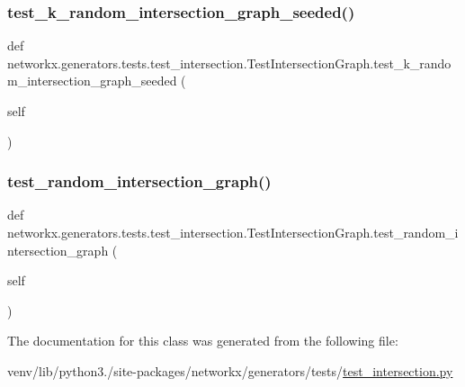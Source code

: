 \subsubsection{\texorpdfstring{test\+\_\+k\+\_\+random\+\_\+intersection\+\_\+graph\+\_\+seeded()}{test\_k\_random\_intersection\_graph\_seeded()}}
{\footnotesize\ttfamily def networkx.\+generators.\+tests.\+test\+\_\+intersection.\+Test\+Intersection\+Graph.\+test\+\_\+k\+\_\+random\+\_\+intersection\+\_\+graph\+\_\+seeded (\begin{DoxyParamCaption}\item[{}]{self }\end{DoxyParamCaption})}

\mbox{\label{classnetworkx_1_1generators_1_1tests_1_1test__intersection_1_1TestIntersectionGraph_aafbbefa0eaa78c5a6d2fe923a6c69c68}} 
\subsubsection{\texorpdfstring{test\+\_\+random\+\_\+intersection\+\_\+graph()}{test\_random\_intersection\_graph()}}
{\footnotesize\ttfamily def networkx.\+generators.\+tests.\+test\+\_\+intersection.\+Test\+Intersection\+Graph.\+test\+\_\+random\+\_\+intersection\+\_\+graph (\begin{DoxyParamCaption}\item[{}]{self }\end{DoxyParamCaption})}



The documentation for this class was generated from the following file\+:\begin{DoxyCompactItemize}
\item 
venv/lib/python3./site-\/packages/networkx/generators/tests/\hyperlink{test__intersection_8py}{test\+\_\+intersection.\+py}\end{DoxyCompactItemize}
